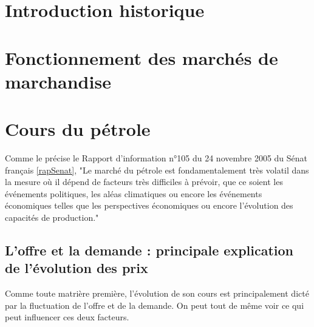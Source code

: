 \section{Introduction historique}

\section{Fonctionnement des marchés de marchandise}

\section{Cours du pétrole}
Comme le précise le Rapport d’information n°105 du 24 novembre 2005 du Sénat français \ref{rapSenat}, "Le marché du pétrole est fondamentalement très volatil dans la mesure où il dépend de facteurs très difficiles à prévoir, que ce soient les événements politiques, les aléas climatiques ou encore les événements économiques telles que les perspectives économiques ou encore l’évolution des capacités de production."
\subsection{L’offre et la demande : principale explication de l’évolution des prix}
Comme toute matrière première, l’évolution de son cours est principalement dicté par la fluctuation de l’offre et de la demande. On peut tout de même voir ce qui peut influencer ces deux facteurs.
